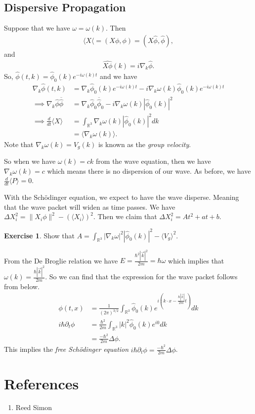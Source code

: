 \documentclass[leqno]{article}
\theoremstyle{definition}
\newtheorem*{exercise}{Exercise}
\theoremstyle{remark}
\theoremstyle{theorem}
\newcommand{\R}{\mathbb{R}}
\begin{document}
\subsection{Dispersive Propagation}

Suppose that we have $\omega = \omega(k)$.  Then
\begin{align*}
\langle X \langle = (X\phi,\phi) = (X\hat{\phi},\hat{\phi}),
\end{align*}
and
\begin{align*}
\hat{X\phi}(k)=i\nabla_k \hat{\phi}.
\end{align*}
So, $\hat{\phi}(t,k)=\hat{\phi}_0(k)e^{-i\omega(k)t}$ and we have
\begin{align*}
\nabla_k \hat{\phi}(t,k)&= \nabla_k \hat{\phi}_0 (k)e^{-i\omega(k)t}-i\nabla_k \omega(k)\hat{\phi}_0(k)e^{-i\omega(k)t}\\
\implies \nabla_k \hat{\phi}\overline{\hat{\phi}}&=\nabla_k \hat{\phi}_0 \overline{\hat{\phi}}_0 - i\nabla_k \omega(k) |\hat{\phi}_0 (k)|^2\\
\implies \frac{d}{dt} \langle X \rangle &=\int_{\R^3} \nabla_k \omega(k)|\hat{\phi}_0 (k)|^2 dk\\
&= \langle \nabla_k \omega(k) \rangle.
\end{align*}
Note that $\nabla_k \omega(k)=V_g (k)$ is known as the \emph{group velocity}.

So when we have $\omega(k)=ck$ from the wave equation, then we have $\nabla_k \omega(k)=c$ which means there is no dispersion of our wave.  As before, we have $\frac{d}{dt} \langle P \rangle = 0$.

With the Sch{\"o}dinger equation, we expect to have the wave disperse.  Meaning that the wave packet will widen as time passes.  We have $\Delta X_i^2=\|X_i \phi \|^2 - (\langle X_i \rangle)^2$. Then we claim that $\Delta X_i^2=At^2+at+b$.  

\begin{exercise}
Show that $A=\int_{\R^3} |\nabla_k \omega|^2|\hat{\phi}_0(k)|^2-\langle V_g \rangle ^2$.
\end{exercise}

From the De Broglie relation we have $E=\frac{\hbar^2 |\vec{k}|^2}{2m}=\hbar \omega$ which implies that $\omega(k)=\frac{\hbar|\vec{k}|^2}{2m}$.  So we can find that the expression for the wave packet follows from below.
\begin{align*}
\phi(t,x)&=\frac{1}{(2\pi)^{3/2}} \int_{\R^3} \hat{\phi}_0 (k) e^{i\left(k\cdot x - \frac{\hbar |\vec{k}|}{2m}t\right)}dk\\
i\hbar \partial_t \phi &= \frac{\hbar^2}{2m}\int_{\R^3}|k|^2 \hat{\phi}_0 (k) e^{i0}dk\\
&= \frac{-\hbar^2}{2m}\Delta \phi.
\end{align*}
This implies the \emph{free Sch{\"o}dinger equation} $i\hbar \partial_t \phi = \frac{-\hbar^2}{2m}\Delta \phi$.





\pagebreak
\section{References}
\begin{enumerate}[1.]
\item Reed Simon
\end{enumerate}
\end{document}

